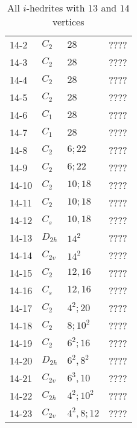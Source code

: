 \documentclass[12pt]{article}
\begin{document}
\begin{table}
\begin{center}
{\begin{minipage}[t]{6cm}
\begin{tabular}{||l|l|l|l||}
14-2	&$C_{2}$	&$28$		&????\\
14-3	&$C_2$	&$28$		&????\\
14-4 	&$C_2$	&$28$		&????\\
14-5 	&$C_2$	&$28$		&????\\
14-6 	&$C_1$	&$28$		&????\\
14-7 	&$C_1$	&$28$		&????\\
14-8	&$C_{2}$	&$6; 22$		&????\\
14-9 	&$C_2$	&$6; 22$		&????\\
14-10	&$C_2$	&$10; 18$		&????\\
14-11	&$C_2$	&$10; 18$		&????\\
14-12	&$C_s$	&$10, 18$		&????\\
14-13	&$D_{2h}$	&$14^2$		&????\\
14-14	&$C_{2v}$	&$14^2$		&????\\
14-15	&$C_2$	&$12, 16$		&????\\
14-16	&$C_{s}$	&$12, 16$		&????\\
14-17	&$C_2$	&$4^2; 20$	&????\\
14-18	&$C_2$	&$8; 10^2$	&????\\
14-19	&$C_2$	&$6^2; 16$	&????\\
14-20	&$D_{2h}$	&$6^2, 8^2$	&????\\
14-21	&$C_{2v}$	&$6^3, 10$	&????\\
14-22	&$C_{2h}$	&$4^2; 10^2$	&????\\
14-23	&$C_{2v}$	&$4^2, 8; 12$	&????\\\hline
\end{tabular}
\end{minipage}
}
\end{center}
\caption{All $i$-hedrites with $13$ and $14$ vertices}
\label{tab:i-hedrite13_14}
\end{table}
\end{document}
